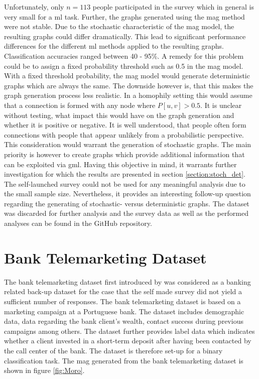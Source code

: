   \noindent Unfortunately, only $n=113$ people participated in the survey which 
  in general is very small for a \acs{ml} task. Further, the graphs generated 
  using the \acs{mag} method were not stable. Due to the stochastic
  characteristic of the \acs{mag} model, the resulting graphs could differ 
  dramatically. This lead to significant performance differences for the
  different \acs{ml} methods applied to the resulting graphs. Classification 
  accuracies ranged between 40 - 95\%. A remedy for this problem could be to 
  assign a fixed probability threshold such as 0.5 in the \acs{mag} model. With 
  a fixed threshold probability, the \acs{mag} model would generate deterministic 
  graphs which are always the same. The downside however is, that this makes the 
  graph generation process less realistic. In a homophily setting this would 
  assume that a connection is formed with any node where $P[u,v]>0.5$. It is 
  unclear without testing, what impact this would have on the graph generation 
  and whether it is positive or negative. It is well understood, that people 
  often form connections with people that appear unlikely from a probabilistic 
  perspective. This consideration would warrant the generation of stochastic 
  graphs. The main priority is however to create graphs which provide additional 
  information that can be exploited via \acs{gml}. Having this objective in mind, 
  it warrants further investigation for which the results are presented in 
  section \ref{section:stoch_det}. \\

  \noindent The self-launched survey could not be used for any meaningful
  analysis due to the small sample size. Nevertheless, it provides an
  interesting follow-up question regarding the generating of
  stochastic- versus deterministic graphs. The dataset was discarded for
  further analysis and the survey data as well as the performed analyses can be
  found in the GitHub repository. 

  \section{Bank Telemarketing Dataset}
  \label{section:bank_data}

  The bank telemarketing dataset first introduced by 
  \cite{moro2011using,moro2014data} was considered as a banking related back-up 
  dataset for the case that the self made survey did not yield a sufficient 
  number of responses. The bank telemarketing dataset is based on a marketing 
  campaign at a Portuguese bank. The dataset includes demographic data, data 
  regarding the bank client's wealth, contact success during previous campaigns
  among others. The dataset further provides label data which indicates whether 
  a client invested in a short-term deposit after having been contacted by the
  call center of the bank. The dataset is therefore set-up for a binary 
  classification task. The \acs{mag} generated from the bank telemarketing 
  dataset is shown in figure \ref{fig:Moro}.
 
